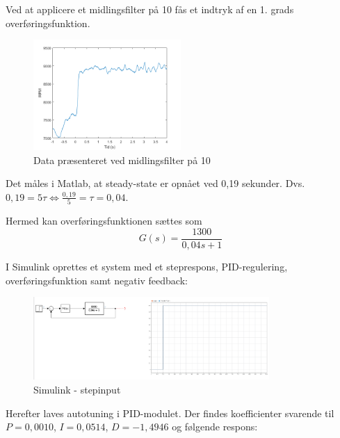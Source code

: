 Ved at applicere et midlingsfilter på 10 fås et indtryk af en 1. grads overføringsfunktion.

\begin{figure}[h]
  \centering
  \includegraphics[width=0.5\textwidth]{./figurer/mo5.png}
  \caption{Data præsenteret ved midlingsfilter på 10}
  \label{fig:mo5}
\end{figure}

Det måles i Matlab, at steady-state er opnået ved 0,19 sekunder. Dvs. $0,19 = 5\tau \Leftrightarrow \frac{0,19}{5}=\tau=0,04$.

Hermed kan overføringsfunktionen sættes som
\begin{equation}
  \label{eq:1}
G(s) = \frac{1300}{0,04s+1}  
\end{equation}


I Simulink oprettes et system med et steprespons, PID-regulering, overføringsfunktion samt negativ feedback:

\begin{figure}[h]
  \centering
  \includegraphics[width=0.8\textwidth]{./figurer/sbil1.png}
  \caption{Simulink - stepinput}
  \label{fig:sbil1}
\end{figure}

Herefter laves autotuning i PID-modulet. Der findes koefficienter svarende til $P=0,0010$, $I=0,0514$, $D=-1,4946$ og følgende respons:

